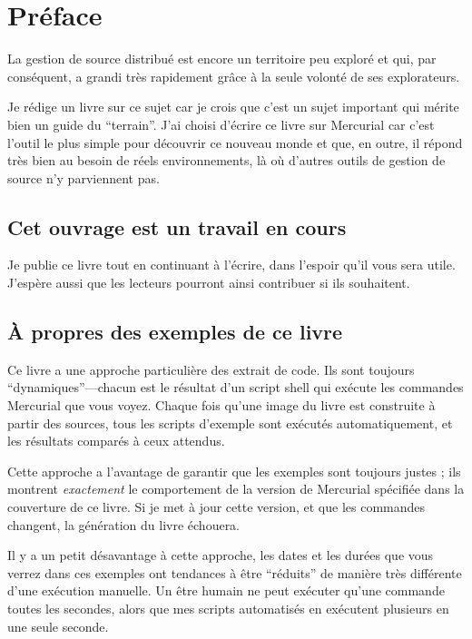 \chapter*{Préface}
\label{chap:preface}

La gestion de source distribué est encore un territoire peu exploré
et qui, par conséquent, a grandi très rapidement grâce à la seule 
volonté de ses explorateurs.

Je rédige un livre sur ce sujet car je crois que c'est un sujet 
important qui mérite bien un guide du ``terrain''. J'ai choisi d'écrire
ce livre sur Mercurial car c'est l'outil le plus simple pour découvrir
ce nouveau monde et que, en outre, il répond très bien au besoin de
réels environnements, là où d'autres outils de gestion de source n'y
parviennent pas.

\section{Cet ouvrage est un travail en cours}

Je publie ce livre tout en continuant à l'écrire, dans l'espoir qu'il
vous sera utile. J'espère aussi que les lecteurs pourront ainsi contribuer
si ils souhaitent.

\section{À propres des exemples de ce livre}

Ce livre a une approche particulière des extrait de code. Ils sont 
toujours ``dynamiques''---chacun est le résultat d'un script shell qui
exécute les commandes Mercurial que vous voyez. Chaque fois qu'une 
image du livre est construite à partir des sources, tous les scripts d'exemple
sont exécutés automatiquement, et les résultats comparés à ceux attendus.

Cette approche a l'avantage de garantir que les exemples sont toujours
justes ; ils montrent \emph{exactement} le comportement de la version de
Mercurial spécifiée dans la couverture de ce livre. Si je met à jour cette
version, et que les commandes changent, la génération du livre échouera.

Il y a un petit désavantage à cette approche, les dates et les
durées que vous verrez dans ces exemples ont tendances à être
``réduits'' de manière très différente d'une exécution manuelle. Un être humain
ne peut exécuter qu'une commande toutes les secondes, alors que mes scripts
automatisés en exécutent plusieurs en une seule seconde.

